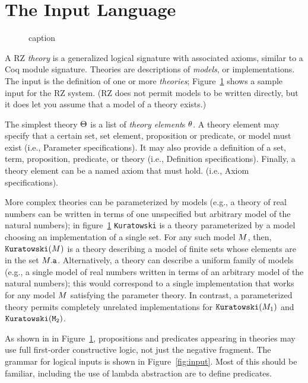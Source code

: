 
\section{The Input Language}
\label{sec:input-language}

\begin{figure}[htbp]
	\caption{caption}
	\label{fig:typicalinput}
\end{figure}


A RZ \emph{theory} is a generalized
logical signature with associated axioms, similar to a Coq module signature.
Theories are descriptions of \emph{models}, or implementations. The input is the
definition of one or more \emph{theories}; 
Figure~\ref{fig:typicalinput} shows a sample input for the RZ system. 
(RZ does not permit models to be written directly, but it does let you
assume that a model of a theory exists.)

The simplest theory $\Theta$ is a list of \emph{theory element}\/s $\theta$. A theory element may specify that a certain set, set element, proposition or predicate, or model must exist (i.e.,
\textsf{Parameter} specifications). It may also provide a definition of a set, term, proposition, predicate, or theory (i.e., \textsf{Definition} specifications). Finally, a theory element can be
a named axiom that must hold. (i.e., \textsf{Axiom} specifications).

More complex theories can be parameterized by models (e.g., a theory
of real numbers can be written in terms of one unspecified but
arbitrary model of the natural numbers); in
figure~\ref{fig:typicalinput} \texttt{Kuratowski} is a theory
parameterized by a model choosing an implementation of a single set.
For any such model $M$, then, $\mathtt{Kuratowski}(M)$ is a theory
describing a model of finite sets whose elements are in the set
$M{.}\mathtt{a}$. Alternatively, a theory can describe a
uniform family of models (e.g., a single model of real numbers written
in terms of an arbitrary model of the natural numbers); this would
correspond to a single implementation that works for any model $M$
satisfying the parameter theory. In contrast, a parameterized theory
permits completely unrelated implementations for
$\mathtt{Kuratowski}(M_1)$ and $\mathtt{Kuratowski(M_2)}$.

As shown in in Figure~\ref{fig:typicalinput}, propositions and predicates
appearing in theories may use full first-order constructive logic, not just the
negative fragment. The grammar for logical inputs is shown in
Figure~\ref{fig:input}. Most of this should be familiar, including the use of
lambda abstraction are to define predicates.

